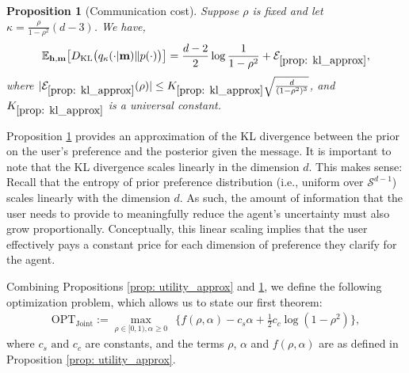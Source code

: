 \documentclass[12pt]{article}
\newcommand{\EE}{\mathbb E}
\newtheorem{proposition}[theorem]{Proposition}
\theoremstyle{definition}
\theoremstyle{remark}
\begin{document}
\begin{proposition}[Communication cost]
\label{prop: kl_approx}
Suppose $\rho$ is fixed and let $\kappa = \frac{\rho}{1-\rho^2}(d-3)$. We have,
\begin{align*}
\EE_{\mathbf{h},\mathbf{m}} \big[D_{\mathrm{KL}}\big(q_{\kappa}(\cdot|\mathbf{m}) \| p(\cdot)\big) \big] = \frac{d-2}{2} \log \frac{1}{1-\rho^2} + \mathcal{E}_{\ref{prop: kl_approx}},
\end{align*}
where $|\mathcal{E}_{\ref{prop: kl_approx}}(\rho)| \leq K_{\ref{prop: kl_approx}} \sqrt{\frac{d}{(1-\rho^2)^3}}$, and $K_{\ref{prop: kl_approx}}$ is a universal constant.
\end{proposition}

Proposition \ref{prop: kl_approx} provides an approximation of the KL divergence between the prior on the user's preference and the posterior given the message. It is important to note that the KL divergence scales linearly in the dimension $d$. This makes sense: Recall that the entropy of prior preference distribution (i.e., uniform over $\mathcal{S}^{d-1}$) scales linearly with the dimension $d$. As such, the amount of information that the user needs to provide to meaningfully reduce the agent's uncertainty must also grow proportionally. Conceptually, this linear scaling implies that the user effectively pays a constant price for each dimension of preference they clarify for the agent.

Combining Propositions \ref{prop: utility_approx} and \ref{prop: kl_approx}, we define the following optimization problem, which allows us to state our first theorem:
\begin{align}
\label{eq:joint_opt}
\text{OPT}_{\text{Joint}} := \max_{\rho \in [0,1), \alpha \geq 0} \ \ \Big \{ f(\rho,\alpha) - c_s \alpha + \frac{1}{2} c_c \log (1-\rho^2) \Big\},
\end{align}
where $c_s  \text{ and } c_c$ are constants, and the terms $\rho$, $\alpha$ and $f(\rho,\alpha)$ are as defined in Proposition \ref{prop: utility_approx}.
\end{document}
